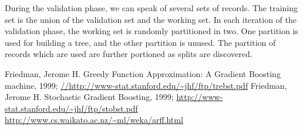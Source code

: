 \documentclass{article}
\begin{document}
During the validation phase, we can speak of several sets of records.
The training set is the union of the validation set and the working
set.  In each iteration of the validation phase, the working set is
randomly partitioned in two.  One partition is used for building a
tree, and the other partition is unused.  The partition of records
which are used are further portioned as splits are discovered.

\begin{thebibliography}{5}
Friedman, Jerome H.  Greedy Function Approximation: A
  Gradient Boosting machine, 1999;
  \url{//http://www-stat.stanford.edu/~jhf/ftp/trebst.pdf}
Friedman, Jerome H.  Stochastic Gradient Boosting, 1999;
  \url{http://www-stat.stanford.edu/~jhf/ftp/stobst.pdf}
 \url{http://www.cs.waikato.ac.nz/~ml/weka/arff.html}
\end{thebibliography}
\end{document}
